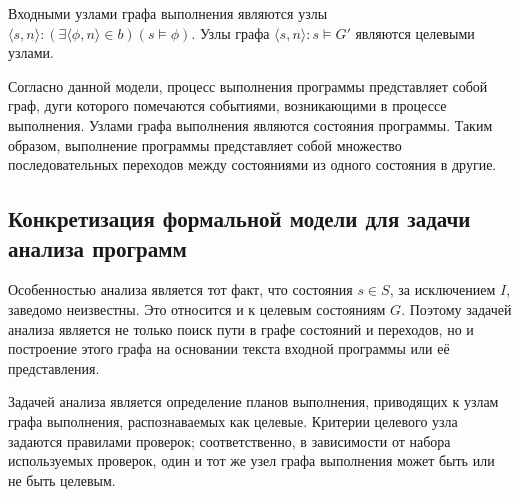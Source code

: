 Входными узлами графа выполнения являются узлы $ \langle s, n \rangle: (\exists \langle \phi, n \rangle \in b)(s \models \phi)$. Узлы графа $ \langle s, n \rangle: s \models G'$ являются целевыми узлами.


Согласно данной модели, процесс выполнения программы представляет собой граф, дуги которого помечаются событиями, возникающими в процессе выполнения. Узлами графа выполнения являются состояния программы. Таким образом, выполнение программы представляет собой множество последовательных переходов между состояниями из одного состояния в другие.

\subsection{Конкретизация формальной модели для задачи анализа программ}

Особенностью анализа является тот факт, что состояния $s \in S$, за исключением $I$, заведомо неизвестны. Это относится и к целевым состояниям $G$. Поэтому задачей анализа является не только поиск пути в графе состояний и переходов, но и построение этого графа на основании текста входной программы или её представления.

Задачей анализа является определение планов выполнения, приводящих к узлам графа выполнения, распознаваемых как целевые. Критерии целевого узла задаются правилами проверок; соответственно, в зависимости от набора используемых проверок, один и тот же узел графа выполнения может быть или не быть целевым.

